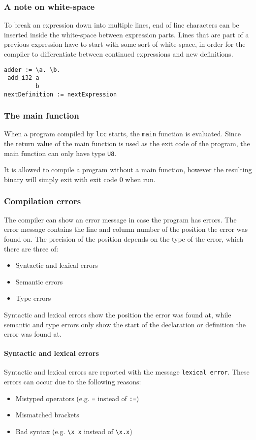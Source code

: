 \documentclass[12pt]{article}
\begin{document}
\subsubsection{A note on white-space}

To break an expression down into multiple lines, end of line characters can be
inserted inside the white-space between expression parts. Lines that are part of
a previous expression have to start with some sort of white-space, in order for
the compiler to differentiate between continued expressions and new definitions.
\lstset{showspaces=true}
\begin{lstlisting}
adder := \a. \b.
 add_i32 a
         b
nextDefinition := nextExpression
\end{lstlisting}
\lstset{showspaces=false}

\subsubsection{The main function}

When a program compiled by \verb$lcc$ starts, the \verb$main$ function is
evaluated. Since the return value of the main function is used as the exit code
of the program, the main function can only have type \verb$U8$.

It is allowed to compile a program without a main function, however the
resulting binary will simply exit with exit code 0 when run.

\subsubsection{Compilation errors}

The compiler can show an error message in case the program has errors. The error
message contains the line and column number of the position the error was found
on. The precision of the position depends on the type of the error, which
there are three of:
\begin{itemize}
    \item Syntactic and lexical errors
    \item Semantic errors
    \item Type errors
\end{itemize}

Syntactic and lexical errors show the position the error was found at, while
semantic and type errors only show the start of the declaration or definition
the error was found at.

\paragraph{Syntactic and lexical errors} Syntactic and lexical errors are
reported with the message \verb$lexical error$. These errors can occur due to
the following reasons:
\begin{itemize}
    \item Mistyped operators (e.g. \verb$=$ instead of \verb$:=$)
    \item Mismatched brackets 
    \item Bad syntax (e.g. \verb$\x x$ instead of \verb$\x.x$)
\end{itemize}
\end{document}
